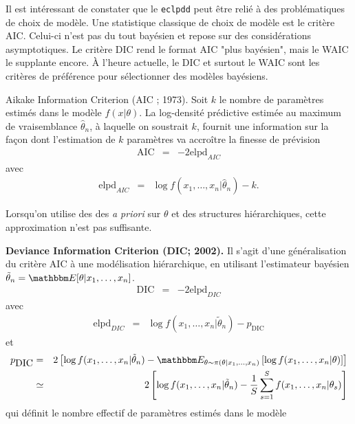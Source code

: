 Il est intéressant de constater que le \texttt{eclpdd} peut être relié à des problématiques de choix de modèle. Une statistique classique de choix de modèle est le critère AIC. Celui-ci n'est pas du tout bayésien et repose sur des considérations asymptotiques. Le critère DIC rend le format AIC "plus bayésien", mais le WAIC le supplante encore. \`A l'heure actuelle, le DIC et surtout le WAIC sont les critères de préférence pour sélectionner des modèles bayésiens. \\

\begin{definition}{Aikake Information Criterion (AIC ; 1973).}
Soit $k$ le nombre de paramètres estimés dans le modèle $f(x|\theta)$. La log-densité prédictive estimée au maximum de vraisemblance $\hat{\theta}_n$, à laquelle on soustrait $k$, fournit une information sur la fa\c con dont l'estimation de $k$ paramètres va accroître la finesse de prévision
\begin{eqnarray*}
\mbox{AIC} & = & -2\mbox{elpd}_{AIC}
\end{eqnarray*}
avec
\begin{eqnarray*}
\mbox{elpd}_{AIC} & = & \log f(x_1,\ldots,x_n|\hat{\theta}_n) - k.
\end{eqnarray*}
\end{definition}

Lorsqu'on utilise des des {\it a priori} sur $\theta$ et des structures hiérarchiques, cette approximation n'est pas suffisante. 

\begin{definition}{\bf Deviance Information Criterion (DIC; 2002).}
Il s'agit d'une généralisation du critère AIC à une modélisation hiérarchique, en utilisant l'estimateur bayésien $\tilde{\theta}_n=\E[\theta|x_1,\ldots,x_n]$.
\begin{eqnarray*}
\mbox{DIC} & = & -2\mbox{elpd}_{DIC}
\end{eqnarray*}
avec
\begin{eqnarray*}
\mbox{elpd}_{DIC} & = & \log f(x_1,\ldots,x_n|\tilde{\theta}_n) - p_{\mbox{DIC}}
\end{eqnarray*}
et
\begin{eqnarray*}
p_{\mbox{DIC}} & = & 2\left[ \log f(x_1,\ldots,x_n|\tilde{\theta}_n) - \E_{\theta\sim\pi(\theta|x_1,\ldots,x_n)}\left[\log f(x_1,\ldots,x_n|\theta)\right]\right] \\
& \simeq & 2\left[ \log f(x_1,\ldots,x_n|\tilde{\theta}_n) -  \frac{1}{S} \sum\limits_{s=1}^S  f(x_1,\ldots,x_n|\theta_s) \right]
\end{eqnarray*}
qui définit le nombre effectif de paramètres estimés dans le modèle
\end{definition}

